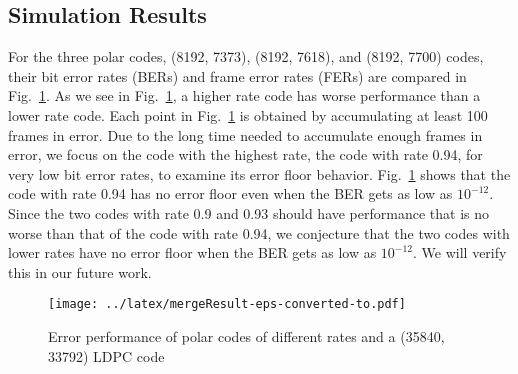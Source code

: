 \documentclass{article}
\begin{document}
\subsection{Simulation Results}
For the three polar codes, (8192, 7373), (8192, 7618), and (8192, 7700) codes, their bit error rates (BERs) and frame error rates (FERs) are compared in Fig.~\ref{fig:merge}. As we see in Fig.~\ref{fig:merge}, a higher rate code has worse performance than a lower rate code. 
Each point in Fig.~\ref{fig:merge} is obtained by accumulating at least 100 frames in error. Due to the long time needed to accumulate enough frames in error, we focus on the code with the highest rate, the code with rate 0.94, for very low bit error rates, to examine its error floor behavior. Fig.~\ref{fig:merge} shows that the code with rate 0.94 has no error floor even when the BER gets as low as $10^{-12}$. Since the two codes with rate 0.9 and 0.93 should have performance that is no worse than that of the code with rate 0.94, we conjecture that the two codes with lower rates have no error floor when the BER gets as low as $10^{-12}$. We will verify this in our future work.
%

\begin{figure}[htbp]
\centering

\texttt{[image: ../latex/mergeResult-eps-converted-to.pdf]}

 \caption{Error performance of polar codes of different rates and a (35840, 33792) LDPC code}
 \label{fig:merge}
\end{figure}

%
%
%
\end{document}

